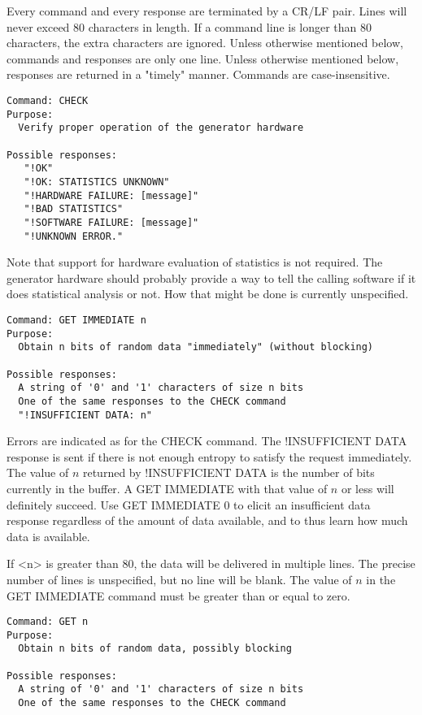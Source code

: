 Every command and every response are terminated by a CR/LF pair. Lines will never exceed 80
characters in length. If a command line is longer than 80 characters, the extra characters are
ignored. Unless otherwise mentioned below, commands and responses are only one line. Unless
otherwise mentioned below, responses are returned in a "timely" manner. Commands are
case-insensitive.

\begin{verbatim}
Command: CHECK
Purpose:
  Verify proper operation of the generator hardware

Possible responses:
   "!OK"
   "!OK: STATISTICS UNKNOWN"
   "!HARDWARE FAILURE: [message]"
   "!BAD STATISTICS"
   "!SOFTWARE FAILURE: [message]"
   "!UNKNOWN ERROR."
\end{verbatim}

Note that support for hardware evaluation of statistics is not required. The generator hardware
should probably provide a way to tell the calling software if it does statistical analysis or
not. How that might be done is currently unspecified.

\begin{verbatim}
Command: GET IMMEDIATE n
Purpose:
  Obtain n bits of random data "immediately" (without blocking)

Possible responses:
  A string of '0' and '1' characters of size n bits
  One of the same responses to the CHECK command
  "!INSUFFICIENT DATA: n"
\end{verbatim}

Errors are indicated as for the CHECK command. The !INSUFFICIENT DATA response is sent if there
is not enough entropy to satisfy the request immediately. The value of $n$ returned by
!INSUFFICIENT DATA is the number of bits currently in the buffer. A GET IMMEDIATE with that
value of $n$ or less will definitely succeed. Use GET IMMEDIATE 0 to elicit an insufficient data
response regardless of the amount of data available, and to thus learn how much data is
available.

If <n> is greater than 80, the data will be delivered in multiple lines. The precise number of
lines is unspecified, but no line will be blank. The value of $n$ in the GET IMMEDIATE command
must be greater than or equal to zero.

\begin{verbatim}
Command: GET n
Purpose:
  Obtain n bits of random data, possibly blocking

Possible responses:
  A string of '0' and '1' characters of size n bits
  One of the same responses to the CHECK command
\end{verbatim}

